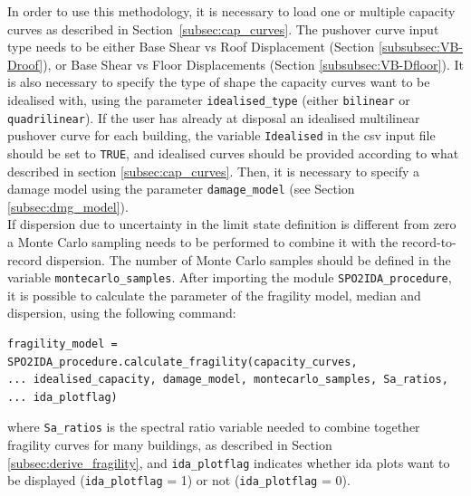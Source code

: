 In order to use this methodology, it is necessary to load one or multiple capacity curves as described in Section~\ref{subsec:cap_curves}. The pushover curve input type needs to be either Base Shear vs Roof Displacement (Section \ref{subsubsec:VB-Droof}), or Base Shear vs Floor Displacements (Section \ref{subsubsec:VB-Dfloor}). It is also necessary to specify the type of shape the capacity curves want to be idealised with, using the parameter \verb=idealised_type= (either \verb=bilinear= or \verb=quadrilinear=). If the user has already at disposal an idealised multilinear pushover curve for each building, the variable \verb=Idealised= in the csv input file should be set to \verb=TRUE=, and idealised curves should be provided according to what described in section \ref{subsec:cap_curves}. Then, it is necessary to specify a damage model using the parameter \verb=damage_model= (see Section \ref{subsec:dmg_model}).\\

If dispersion due to uncertainty in the limit state definition is different from zero a Monte Carlo sampling needs to be performed to combine it with the record-to-record dispersion. The number of Monte Carlo samples should be defined in the variable \verb=montecarlo_samples=.
After importing the module \verb=SPO2IDA_procedure=, it is possible to calculate the parameter of the fragility model, median and dispersion, using the following command:

\begin{Verbatim}[frame=single, commandchars=\\\{\}, samepage=true]
fragility_model = SPO2IDA_procedure.calculate_fragility(capacity_curves,
... idealised_capacity, damage_model, montecarlo_samples, Sa_ratios,
... ida_plotflag)
\end{Verbatim}

where \verb=Sa_ratios= is the spectral ratio variable needed to combine together fragility curves for many buildings, as described in Section \ref{subsec:derive_fragility}, and \verb=ida_plotflag= indicates whether ida plots want to be displayed (\verb=ida_plotflag= = 1) or not (\verb=ida_plotflag= = 0).